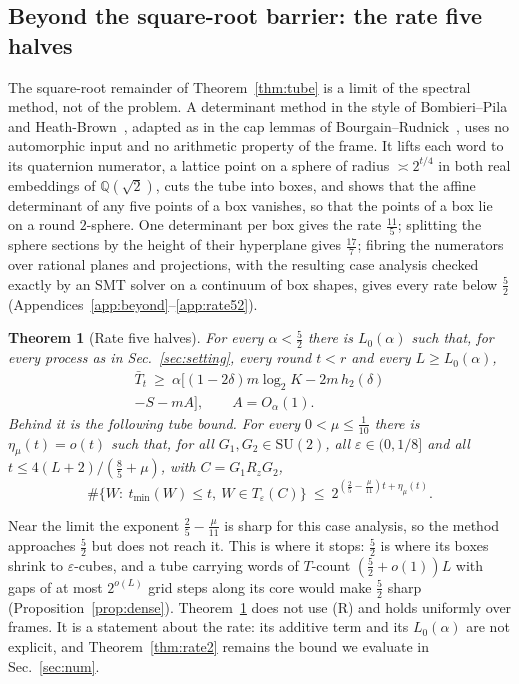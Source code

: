 \documentclass[aps,prx,twocolumn,superscriptaddress,nofootinbib,longbibliography]{revtex4-2}
\theoremstyle{plain}
\newtheorem{theorem}{Theorem}
\theoremstyle{definition}
\theoremstyle{remark}
\newcommand{\Q}{\mathbb{Q}}
\newcommand{\SU}{\mathrm{SU}(2)}
\begin{document}
\subsection{Beyond the square-root barrier: the rate five halves}\label{sec:rate52}

The square-root remainder of Theorem~\ref{thm:tube} is a limit of the spectral method, not of the problem. A determinant method in the style of Bombieri--Pila and Heath-Brown~\cite{BombieriPila,HeathBrown}, adapted as in the cap lemmas of Bourgain--Rudnick~\cite{BourgainRudnick}, uses no automorphic input and no arithmetic property of the frame. It lifts each word to its quaternion numerator, a lattice point on a sphere of radius $\asymp2^{t/4}$ in both real embeddings of $\Q(\sqrt2)$, cuts the tube into boxes, and shows that the affine determinant of any five points of a box vanishes, so that the points of a box lie on a round $2$-sphere. One determinant per box gives the rate $\tfrac{11}5$; splitting the sphere sections by the height of their hyperplane gives $\tfrac{17}7$; fibring the numerators over rational planes and projections, with the resulting case analysis checked exactly by an SMT solver on a continuum of box shapes, gives every rate below $\tfrac52$ (Appendices~\ref{app:beyond}--\ref{app:rate52}).


\begin{theorem}[Rate five halves]\label{thm:rate52}
For every $\alpha<\tfrac52$ there is $L_0(\alpha)$ such that, for every process as in Sec.~\ref{sec:setting}, every round $t<r$ and every $L\ge L_0(\alpha)$,
\begin{multline}\label{eq:rate52}
\bar T_t\ \ge\ \alpha\big[(1-2\delta)m\log_2K-2m\,h_2(\delta)\\-S-mA\big],\qquad A=O_\alpha(1).
\end{multline}
Behind it is the following tube bound. For every $0<\mu\le\tfrac1{10}$ there is $\eta_\mu(t)=o(t)$ such that, for all $G_1,G_2\in\SU$, all $\varepsilon\in(0,1/8]$ and all $t\le4(L+2)/(\tfrac85+\mu)$, with $C=G_1R_zG_2$,
\begin{equation}\label{eq:rate52tube}
\#\{W:\ t_{\min}(W)\le t,\ W\in T_\varepsilon(C)\}\ \le\ 2^{(\frac25-\frac\mu{11})t+\eta_\mu(t)}.
\end{equation}
\end{theorem}
Near the limit the exponent $\tfrac25-\tfrac\mu{11}$ is sharp for this case analysis, so the method approaches $\tfrac52$ but does not reach it. This is where it stops: $\tfrac52$ is where its boxes shrink to $\varepsilon$-cubes, and a tube carrying words of $T$-count $(\tfrac52+o(1))L$ with gaps of at most $2^{o(L)}$ grid steps along its core would make $\tfrac52$ sharp (Proposition~\ref{prop:dense}). Theorem~\ref{thm:rate52} does not use (R) and holds uniformly over frames. It is a statement about the rate: its additive term and its $L_0(\alpha)$ are not explicit, and Theorem~\ref{thm:rate2} remains the bound we evaluate in Sec.~\ref{sec:num}.
\end{document}
